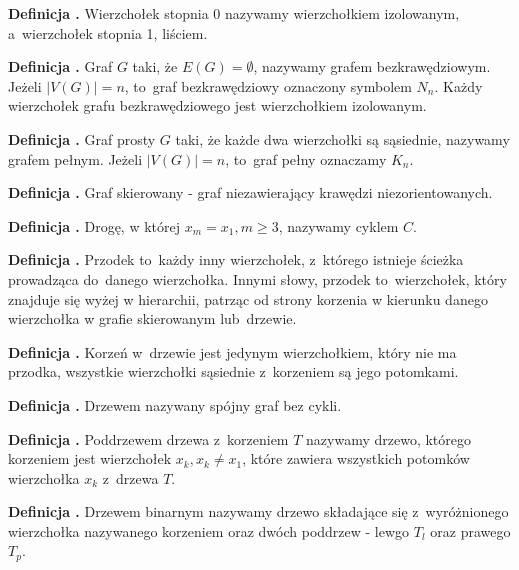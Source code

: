 \noindent
\textbf{Definicja .}
\incrementdefinitionIndex
Wierzchołek stopnia 0 nazywamy wierzchołkiem izolowanym, a~wierzchołek stopnia 1, liściem.

\noindent
\textbf{Definicja .}
\incrementdefinitionIndex
Graf $G$ taki, że $E(G) = \emptyset$, nazywamy grafem bezkrawędziowym. Jeżeli $|V(G)| = n$, to~graf bezkrawędziowy oznaczony symbolem $N_n$.
Każdy wierzchołek grafu bezkrawędziowego jest wierzchołkiem izolowanym.

\noindent
\textbf{Definicja .}
\incrementdefinitionIndex
Graf prosty $G$ taki, że każde dwa wierzchołki są sąsiednie, nazywamy grafem pełnym.
Jeżeli $|V(G)| = n$, to~graf pełny oznaczamy $K_n$.

\noindent
\textbf{Definicja .}
\incrementdefinitionIndex
Graf skierowany - graf niezawierający krawędzi niezorientowanych.

\noindent
\textbf{Definicja .}
\incrementdefinitionIndex
Drogę, w której $x_m = x_1, m \geqslant 3$, nazywamy cyklem $C$.

\noindent
\textbf{Definicja .}
\incrementdefinitionIndex
Przodek to~każdy inny wierzchołek, z~którego istnieje ścieżka prowadząca do~danego wierzchołka.
Innymi słowy, przodek to~wierzchołek, który znajduje się wyżej w hierarchii,
patrząc od strony korzenia w kierunku danego wierzchołka w grafie skierowanym lub~drzewie.

\noindent
\textbf{Definicja .}
\incrementdefinitionIndex
Korzeń w~drzewie jest jedynym wierzchołkiem,
który nie ma przodka, wszystkie wierzchołki sąsiednie z~korzeniem są jego potomkami.

\noindent
\textbf{Definicja .}
\incrementdefinitionIndex
Drzewem nazywany spójny graf bez cykli.

\noindent
\textbf{Definicja .}
\incrementdefinitionIndex
Poddrzewem drzewa z~korzeniem $T$ nazywamy drzewo, którego korzeniem jest wierzchołek $x_k, x_k \neq x_1$,
które zawiera wszystkich potomków wierzchołka $x_k$ z~drzewa $T$.

\noindent
\textbf{Definicja .}
\incrementdefinitionIndex
Drzewem binarnym nazywamy drzewo składające się z~wyróżnionego wierzchołka nazywanego korzeniem oraz dwóch poddrzew
- lewgo $T_l$ oraz prawego $T_p$.